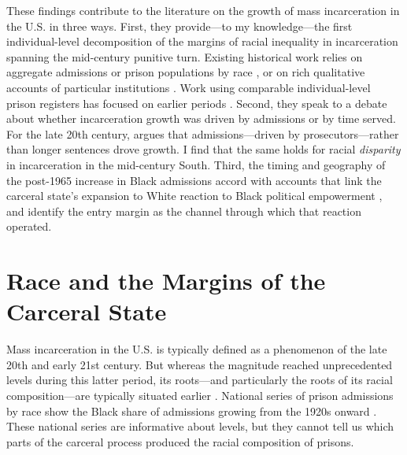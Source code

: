 \documentclass[12pt]{article}
\begin{document}
These findings contribute to the literature on the growth of mass incarceration in the U.S. in three ways.  First, they provide---to my knowledge---the first individual-level decomposition of the margins of racial inequality in incarceration spanning the mid-century punitive turn.  Existing historical work relies on aggregate admissions or prison populations by race \citep{Langan:1991ud,Muller:2012wf,EubankFresh:2021gg,Duxbury:2023em}, or on rich qualitative accounts of particular institutions \citep{Oshinsky:1997up,Lynch:2010rt,Schoenfeld:2018vq}.  Work using comparable individual-level prison registers has focused on earlier periods \citep{10.1017/s002205072610148x}.  Second, they speak to a debate about whether incarceration growth was driven by admissions or by time served.  For the late 20th century, \cite{Pfaff:2017tp} argues that admissions---driven by prosecutors---rather than longer sentences drove growth.  I find that the same holds for racial \emph{disparity} in incarceration in the mid-century South.  Third, the timing and geography of the post-1965 increase in Black admissions accord with accounts that link the carceral state's expansion to White reaction to Black political empowerment \citep{Blalock:1967ud,Weaver:2007vr,EubankFresh:2021gg}, and identify the entry margin as the channel through which that reaction operated.







\vspace*{-.1in}
\section*{Race and the Margins of the Carceral State}
\vspace*{-.1in}

\noindent Mass incarceration in the U.S. is typically defined as a phenomenon of the late 20th and early 21st century.  But whereas the magnitude reached unprecedented levels during this latter period, its roots---and particularly the roots of its racial composition---are typically situated earlier \citep{Muller:2012wf,Thompson:2019wo,Beckett:2020vz}.  National series of prison admissions by race show the Black share of admissions growing from the 1920s onward \citep{Langan:1991ud}.  These national series are informative about levels, but they cannot tell us which parts of the carceral process produced the racial composition of prisons.
\end{document}
